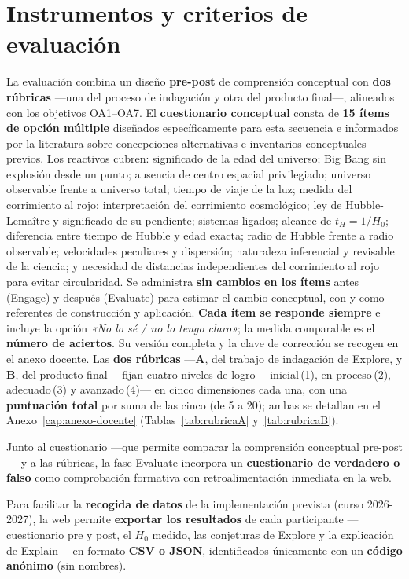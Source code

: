 \section{Instrumentos y criterios de evaluación}\label{sec:instrumentos}

La evaluación combina un diseño \textbf{pre-post} de comprensión conceptual con \textbf{dos rúbricas} ---una del proceso de indagación y otra del producto final---, alineados con los objetivos OA1--OA7. El \textbf{cuestionario conceptual} consta de \textbf{15 ítems de opción múltiple} diseñados específicamente para esta secuencia e informados por la literatura sobre concepciones alternativas e inventarios conceptuales previos. Los reactivos cubren: significado de la edad del universo; Big Bang sin explosión desde un punto; ausencia de centro espacial privilegiado; universo observable frente a universo total; tiempo de viaje de la luz; medida del corrimiento al rojo; interpretación del corrimiento cosmológico; ley de Hubble-Lemaître y significado de su pendiente; sistemas ligados; alcance de $t_H=1/H_0$; diferencia entre tiempo de Hubble y edad exacta; radio de Hubble frente a radio observable; velocidades peculiares y dispersión; naturaleza inferencial y revisable de la ciencia; y necesidad de distancias independientes del corrimiento al rojo para evitar circularidad. Se administra \textbf{sin cambios en los ítems} antes (Engage) y después (Evaluate) para estimar el cambio conceptual, con \textcite{salimpour2022} y \textcite{gasparini2025} como referentes de construcción y aplicación. \textbf{Cada ítem se responde siempre} e incluye la opción \emph{«No lo sé / no lo tengo claro»}; la medida comparable es el \textbf{número de aciertos}. Su versión completa y la clave de corrección se recogen en el anexo docente. Las \textbf{dos rúbricas} ---\textbf{A}, del trabajo de indagación de Explore, y \textbf{B}, del producto final--- fijan cuatro niveles de logro ---inicial\,(1), en proceso\,(2), adecuado\,(3) y avanzado\,(4)--- en cinco dimensiones cada una, con una \textbf{puntuación total} por suma de las cinco (de 5 a 20); ambas se detallan en el Anexo~\ref{cap:anexo-docente} (Tablas~\ref{tab:rubricaA} y~\ref{tab:rubricaB}).

Junto al cuestionario ---que permite comparar la comprensión conceptual pre-post--- y a las rúbricas, la fase Evaluate incorpora un \textbf{cuestionario de verdadero o falso} como comprobación formativa con retroalimentación inmediata en la web.

Para facilitar la \textbf{recogida de datos} de la implementación prevista (curso 2026-2027), la web permite \textbf{exportar los resultados} de cada participante ---cuestionario pre y post, el $H_{0}$ medido, las conjeturas de Explore y la explicación de Explain--- en formato \textbf{CSV o JSON}, identificados únicamente con un \textbf{código anónimo} (sin nombres).

